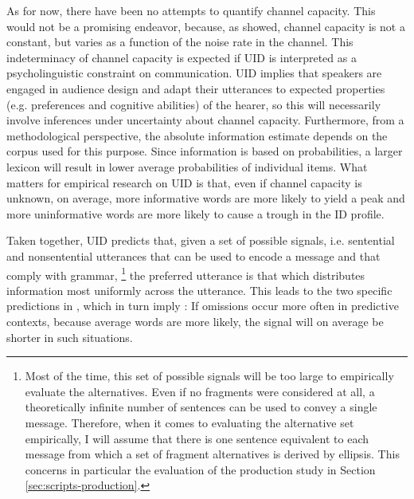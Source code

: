 As for now, there have been no attempts to quantify channel capacity. This would not be a promising endeavor, because, as \citet{shannon1948} showed, channel capacity is not a constant, but varies as a function of the noise rate in the channel. This indeterminacy of channel capacity is expected if UID is interpreted as a psycholinguistic constraint on communication. UID implies that speakers are engaged in audience design and adapt their utterances to expected properties (e.g. preferences and cognitive abilities) of the hearer, so this will necessarily involve inferences under uncertainty about channel capacity. Furthermore, from a methodological perspective, the absolute information estimate depends on the corpus used for this purpose. Since information is based on probabilities, a larger lexicon will result in lower average probabilities of individual items. What matters for empirical research on UID is that, even if channel capacity is unknown, on average, more informative words are more likely to yield a peak and more uninformative words are more likely to cause a trough in the ID profile.

Taken together, UID predicts that, given a set of possible signals, i.e. sentential and nonsentential utterances that can be used to encode a message and that comply with grammar,%
%
\footnote{Most of the time, this set of possible signals will be too large to empirically evaluate the alternatives. Even if no fragments were considered at all, a theoretically infinite number of sentences can be used to convey a single message. Therefore, when it comes to evaluating the alternative set empirically, I will assume that there is one sentence equivalent to each message from which a set of fragment alternatives is derived by ellipsis. This concerns in particular the evaluation of the production study in Section \ref{sec:scripts-production}.}\afterfn%
% 
the preferred utterance is that which distributes information most uniformly across the utterance. This leads to the two specific predictions in \Next[a,b], which in turn imply \Next[c]: If omissions occur more often in predictive contexts, because average words are more likely, the signal will on average be shorter in such situations.

